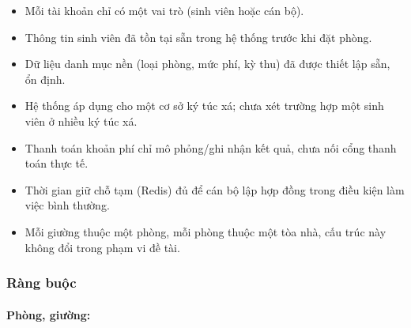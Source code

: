 \begin{itemize}[leftmargin=1.4em]
\item Mỗi tài khoản chỉ có một vai trò (sinh viên hoặc cán bộ).
\item Thông tin sinh viên đã tồn tại sẵn trong hệ thống trước khi đặt phòng.
\item Dữ liệu danh mục nền (loại phòng, mức phí, kỳ thu) đã được thiết lập sẵn, ổn định.
\item Hệ thống áp dụng cho một cơ sở ký túc xá; chưa xét trường hợp một sinh viên ở nhiều ký túc xá.
\item Thanh toán khoản phí chỉ mô phỏng/ghi nhận kết quả, chưa nối cổng thanh toán thực tế.
\item Thời gian giữ chỗ tạm (Redis) đủ để cán bộ lập hợp đồng trong điều kiện làm việc bình thường.
\item Mỗi giường thuộc một phòng, mỗi phòng thuộc một tòa nhà, cấu trúc này không đổi trong phạm vi đề tài.
\end{itemize}

\subsubsection{Ràng buộc}

\paragraph{Phòng, giường:}


